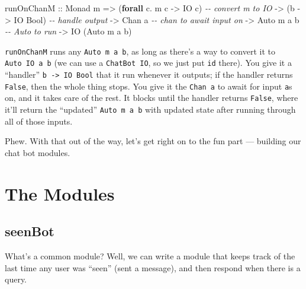 \documentclass[]{article}
\newenvironment{Shaded}{}{}
\newcommand{\CommentTok}[1]{\textcolor[rgb]{0.38,0.63,0.69}{\textit{#1}}}
\newcommand{\DataTypeTok}[1]{\textcolor[rgb]{0.56,0.13,0.00}{#1}}
\newcommand{\KeywordTok}[1]{\textcolor[rgb]{0.00,0.44,0.13}{\textbf{#1}}}
\newcommand{\NormalTok}[1]{#1}
\newcommand{\OperatorTok}[1]{\textcolor[rgb]{0.40,0.40,0.40}{#1}}
\newcommand{\OtherTok}[1]{\textcolor[rgb]{0.00,0.44,0.13}{#1}}
\begin{document}
\begin{Shaded}
\begin{Highlighting}[]
\OtherTok{runOnChanM ::} \DataTypeTok{Monad}\NormalTok{ m}
           \OtherTok{=\textgreater{}}\NormalTok{ (}\KeywordTok{forall}\NormalTok{ c}\OperatorTok{.}\NormalTok{ m c }\OtherTok{{-}\textgreater{}} \DataTypeTok{IO}\NormalTok{ c)   }\CommentTok{{-}{-} convert \textasciigrave{}m\textasciigrave{} to \textasciigrave{}IO\textasciigrave{}}
           \OtherTok{{-}\textgreater{}}\NormalTok{ (b }\OtherTok{{-}\textgreater{}} \DataTypeTok{IO} \DataTypeTok{Bool}\NormalTok{)            }\CommentTok{{-}{-} handle output}
           \OtherTok{{-}\textgreater{}} \DataTypeTok{Chan}\NormalTok{ a                    }\CommentTok{{-}{-} chan to await input on}
           \OtherTok{{-}\textgreater{}} \DataTypeTok{Auto}\NormalTok{ m a b                }\CommentTok{{-}{-} \textasciigrave{}Auto\textasciigrave{} to run}
           \OtherTok{{-}\textgreater{}} \DataTypeTok{IO}\NormalTok{ (}\DataTypeTok{Auto}\NormalTok{ m a b)}
\end{Highlighting}
\end{Shaded}

\texttt{runOnChanM} runs any \texttt{Auto\ m\ a\ b}, as long as there's a way to
convert it to \texttt{Auto\ IO\ a\ b} (we can use a \texttt{ChatBot\ IO}, so we
just put \texttt{id} there). You give it a ``handler''
\texttt{b\ -\textgreater{}\ IO\ Bool} that it run whenever it outputs; if the
handler returns \texttt{False}, then the whole thing stops. You give it the
\texttt{Chan\ a} to await for input \texttt{a}s on, and it takes care of the
rest. It blocks until the handler returns \texttt{False}, where it'll return the
``updated'' \texttt{Auto\ m\ a\ b} with updated state after running through all
of those inputs.

Phew. With that out of the way, let's get right on to the fun part --- building
our chat bot modules.

\section{The Modules}\label{the-modules}

\subsection{seenBot}\label{seenbot}

What's a common module? Well, we can write a module that keeps track of the last
time any user was ``seen'' (sent a message), and then respond when there is a
query.
\end{document}
